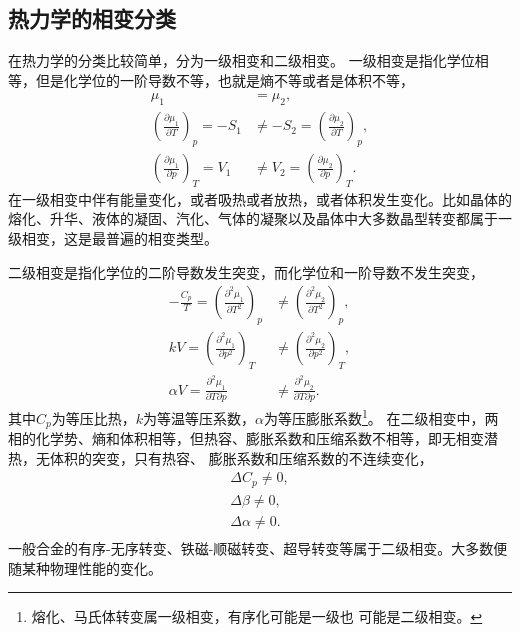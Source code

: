             \subsection{热力学的相变分类}
                在热力学的分类比较简单，分为一级相变和二级相变。
                一级相变是指化学位相等，但是化学位的一阶导数不等，也就是熵不等或者是体积不等，
                \begin{align}
                    \mu_1&=\mu_2,\\
                    \left(  \frac{\partial\mu_1}{\partial T} \right)_p=-S_1&\neq-S_2= \left(  \frac{\partial\mu_2}{\partial T} \right)_p\label{等压一级相变},\\
                    \left(  \frac{\partial\mu_1}{\partial p} \right)_T=V_1&\neq V_2= \left(  \frac{\partial\mu_2}{\partial p} \right)_T\label{等温一级相变}.
                \end{align}
                在一级相变中伴有能量变化，或者吸热或者放热，或者体积发生变化。比如晶体的熔化、升华、液体的凝固、汽化、气体的凝聚以及晶体中大多数晶型转变都属于一级相变，这是最普遍的相变类型。

                二级相变是指化学位的二阶导数发生突变，而化学位和一阶导数不发生突变，
                \begin{align}
                    -\frac{C_p}{T}=\left(  \frac{ \partial^2\mu_1  }{\partial T^2} \right)_p&\neq\left(  \frac{ \partial^2\mu_2  }{\partial T^2} \right)_p,\\
                    kV=\left(  \frac{ \partial^2\mu_1  }{\partial p^2} \right)_T&\neq\left(  \frac{ \partial^2\mu_2  }{\partial p^2} \right)_T,\\
                    \alpha V=\frac{\partial^2\mu_1}{\partial T\partial p}&\neq\frac{\partial^2\mu_2}{\partial T\partial p}.
                \end{align}
                其中$C_p$为等压比热，$k$为等温等压系数，$\alpha$为等压膨胀系数\footnote{熔化、马氏体转变属一级相变，有序化可能是一级也
                可能是二级相变。}。
                在二级相变中，两相的化学势、熵和体积相等，但热容、膨胀系数和压缩系数不相等，即无相变潜热，无体积的突变，只有热容、
                膨胀系数和压缩系数的不连续变化，
                \begin{align*}
                    \Delta C_p\neq 0,\\
                    \Delta\beta\neq 0,\\
                    \Delta\alpha\neq0.\\
                \end{align*}
                一般合金的有序-无序转变、铁磁-顺磁转变、超导转变等属于二级相变。大多数便随某种物理性能的变化。
